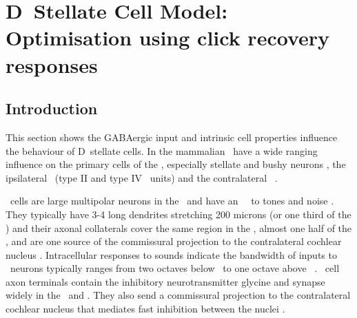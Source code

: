 
\section[DS Cell Model]{D~Stellate Cell Model: Optimisation using click recovery responses}   \label{sec:d-stellate-cell-model}

\subsection{Introduction}

This section shows the GABAergic input and intrinsic cell properties influence the behaviour of D~stellate cells.
In the mammalian \VCN~have a wide ranging influence on the primary cells of the \VCN, especially stellate and bushy neurons \citep{RhodeSmithEtAl:1983}, the ipsilateral \DCN~(type II and type IV \EIRA~units) and the contralateral \CN~\citep{NeedhamPaolini:2007}.



\DS~cells are large multipolar neurons in the \VCN~and have an \OnC~\PSTH~to tones and noise \citep{SmithRhode:1989,NeedhamPaolini:2006}.
They typically have 3-4 long dendrites stretching 200 microns (or one third of the \VCN) and their axonal collaterals cover the same region in the \VCN, almost one half of the \DCN, and are one source of the commissural projection to the contralateral cochlear nucleus \citep{Cant:1992,Cant:1981,SchofieldCant:1996,CantBenson:2003,NeedhamPaolini:2007,PaoliniClark:1999}.
Intracellular responses to sounds indicate the bandwidth of inputs to \DS~neurons typically ranges from two octaves below \CF~to one octave above \CF~\citep{PalmerJiangEtAl:1996,JiangPalmerEtAl:1996,PaoliniClark:1999}.
\DS~cell axon terminals contain the inhibitory neurotransmitter glycine and synapse widely in the \VCN~and \DCN.
They also send a commissural projection to the contralateral cochlear nucleus that mediates fast inhibition between the nuclei \citep{NeedhamPaolini:2003,NeedhamPaolini:2006,Oertel:1997}.

